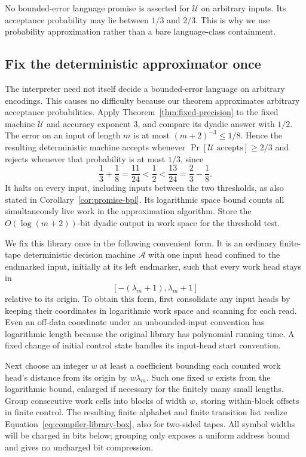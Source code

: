 \documentclass[11pt]{article}
\numberwithin{equation}{section}
\theoremstyle{definition}
\theoremstyle{remark}
\begin{document}
No bounded-error language promise is asserted for ${\mathcal{U}}$ on arbitrary
inputs.  Its acceptance probability may lie between $1/3$ and $2/3$.
This is why we use probability approximation rather than a bare
language-class containment.

\subsection{Fix the deterministic approximator once}
\label{subsec:compiler-library}

The interpreter need not itself decide a bounded-error language on arbitrary encodings. This causes no difficulty because our theorem approximates arbitrary acceptance probabilities. Apply Theorem~\ref{thm:fixed-precision} to the fixed machine ${\mathcal{U}}$ and
accuracy exponent $3$, and compare its dyadic answer with $1/2$.
The error on an input of length $m$ is at most
$(m+2)^{-3}\le1/8$.  Hence the resulting deterministic machine accepts
whenever $\Pr[{\mathcal{U}}\text{ accepts}]\ge2/3$ and rejects whenever that
probability is at most $1/3$, since
\[
 \frac13+\frac18=\frac{11}{24}<\frac12
   <\frac{13}{24}=\frac23-\frac18.
\]
It halts on every input, including inputs between the two thresholds,
as also stated in Corollary~\ref{cor:promise-bpl}.  Its logarithmic
space bound counts all simultaneously live work in the approximation
algorithm.  Store the $O(\log(m+2))$-bit dyadic output in work space
for the threshold test.

We fix this library once in the following convenient form.  It is an
ordinary finite-tape deterministic decision machine ${\mathcal{A}}$ with one input
head confined to the endmarked input, initially at its left endmarker,
such that every work head stays in
\begin{equation}\label{eq:compiler-library-box}
 [-(\lambda_m+1),\lambda_m+1]
\end{equation}
relative to its origin.  To obtain this form, first consolidate any
input heads by keeping their coordinates in logarithmic work space
and scanning for each read.  Even an off-data coordinate under an
unbounded-input convention has logarithmic length because the original
library has polynomial running time.  A fixed change of initial control
state handles its input-head start convention.

Next choose an integer $w$ at least a coefficient bounding each counted
work head's distance from its origin by $w\lambda_m$.  Such one fixed
$w$ exists from the logarithmic bound, enlarged if necessary for the
finitely many small lengths.  Group consecutive work cells into blocks
of width $w$, storing within-block offsets in finite control.  The
resulting finite alphabet and finite transition list realize
Equation~\eqref{eq:compiler-library-box}, also for two-sided tapes.
All symbol widths will be charged in bits below; grouping only exposes
a uniform address bound and gives no uncharged bit compression.
\end{document}
